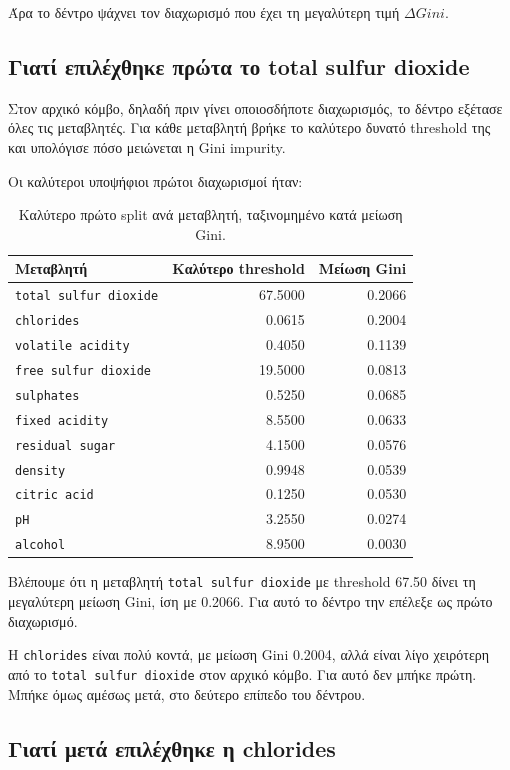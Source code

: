 \documentclass[12pt,a4paper]{article}
\newcommand{\code}[1]{\texttt{\textenglish{#1}}}
\begin{document}
Άρα το δέντρο ψάχνει τον διαχωρισμό που έχει τη μεγαλύτερη τιμή
$\Delta Gini$.

\subsection{Γιατί επιλέχθηκε πρώτα το total sulfur dioxide}

Στον αρχικό κόμβο, δηλαδή πριν γίνει οποιοσδήποτε διαχωρισμός, το δέντρο
εξέτασε όλες τις μεταβλητές. Για κάθε μεταβλητή βρήκε το καλύτερο δυνατό
threshold της και υπολόγισε πόσο μειώνεται η Gini impurity.

Οι καλύτεροι υποψήφιοι πρώτοι διαχωρισμοί ήταν:

\begin{table}[H]
\centering
\caption{Καλύτερο πρώτο split ανά μεταβλητή, ταξινομημένο κατά μείωση Gini.}
\small
\begin{tabular}{lrr}
\toprule
\textbf{Μεταβλητή} & \textbf{Καλύτερο threshold} & \textbf{Μείωση Gini} \\
\midrule
\code{total sulfur dioxide} & 67.5000 & 0.2066 \\
\code{chlorides} & 0.0615 & 0.2004 \\
\code{volatile acidity} & 0.4050 & 0.1139 \\
\code{free sulfur dioxide} & 19.5000 & 0.0813 \\
\code{sulphates} & 0.5250 & 0.0685 \\
\code{fixed acidity} & 8.5500 & 0.0633 \\
\code{residual sugar} & 4.1500 & 0.0576 \\
\code{density} & 0.9948 & 0.0539 \\
\code{citric acid} & 0.1250 & 0.0530 \\
\code{pH} & 3.2550 & 0.0274 \\
\code{alcohol} & 8.9500 & 0.0030 \\
\bottomrule
\end{tabular}
\end{table}

Βλέπουμε ότι η μεταβλητή \code{total sulfur dioxide} με threshold 67.50 δίνει
τη μεγαλύτερη μείωση Gini, ίση με 0.2066. Για αυτό το δέντρο την επέλεξε ως
πρώτο διαχωρισμό.

Η \code{chlorides} είναι πολύ κοντά, με μείωση Gini 0.2004, αλλά είναι λίγο
χειρότερη από το \code{total sulfur dioxide} στον αρχικό κόμβο. Για αυτό δεν
μπήκε πρώτη. Μπήκε όμως αμέσως μετά, στο δεύτερο επίπεδο του δέντρου.

\subsection{Γιατί μετά επιλέχθηκε η chlorides}
\end{document}
